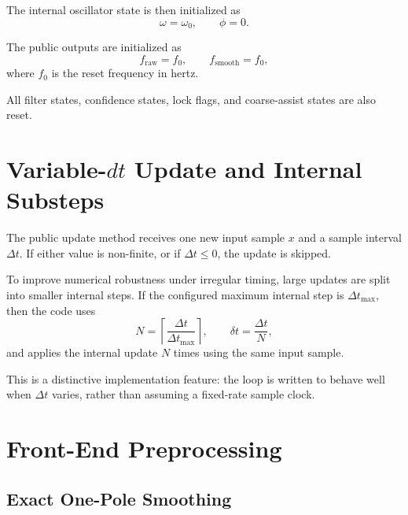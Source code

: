 \documentclass[conference]{IEEEtran}
\begin{document}
    The internal oscillator state is then initialized as
    \begin{equation}
        \omega = \omega_0,
        \qquad
        \phi = 0.
    \end{equation}

    The public outputs are initialized as
    \begin{equation}
        f_{\mathrm{raw}} = f_0,
        \qquad
        f_{\mathrm{smooth}} = f_0,
    \end{equation}
    where \(f_0\) is the reset frequency in hertz.

    All filter states, confidence states, lock flags, and coarse-assist states are
    also reset.

    \section{Variable-\(dt\) Update and Internal Substeps}

    The public update method receives one new input sample \(x\) and a sample
    interval \(\Delta t\). If either value is non-finite, or if \(\Delta t \le 0\),
    the update is skipped.

    To improve numerical robustness under irregular timing, large updates are split
    into smaller internal steps. If the configured maximum internal step is
    \(\Delta t_{\max}\), then the code uses
    \begin{equation}
        N = \left\lceil \frac{\Delta t}{\Delta t_{\max}} \right\rceil,
        \qquad
        \delta t = \frac{\Delta t}{N},
    \end{equation}
    and applies the internal update \(N\) times using the same input sample.

    This is a distinctive implementation feature: the loop is written to behave
    well when \(\Delta t\) varies, rather than assuming a fixed-rate sample clock.

    \section{Front-End Preprocessing}\label{sec:frontend}

    \subsection{Exact One-Pole Smoothing}
\end{document}
